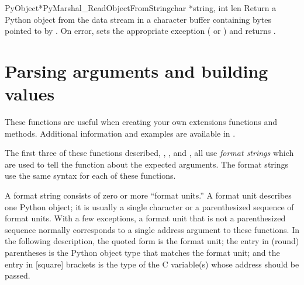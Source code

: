 \begin{cfuncdesc}{PyObject*}{PyMarshal_ReadObjectFromString}{char *string,
                                                             int len}
  Return a Python object from the data stream in a character buffer
  containing  bytes pointed to by .  On error,
  sets the appropriate exception ( or
  ) and returns \NULL.
\end{cfuncdesc}


\section{Parsing arguments and building values
         \label{arg-parsing}}

These functions are useful when creating your own extensions functions
and methods.  Additional information and examples are available in
.

The first three of these functions described,
,
, and
, all use \emph{format strings} which are
used to tell the function about the expected arguments.  The format
strings use the same syntax for each of these functions.

A format string consists of zero or more ``format units.''  A format
unit describes one Python object; it is usually a single character or
a parenthesized sequence of format units.  With a few exceptions, a
format unit that is not a parenthesized sequence normally corresponds
to a single address argument to these functions.  In the following
description, the quoted form is the format unit; the entry in (round)
parentheses is the Python object type that matches the format unit;
and the entry in [square] brackets is the type of the C variable(s)
whose address should be passed.

